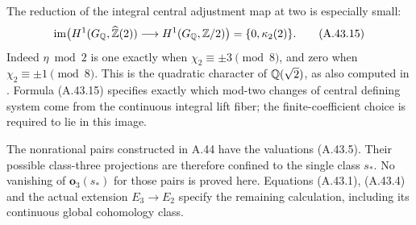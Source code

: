 The reduction of the integral central adjustment map at two
is especially small:
\[
 \operatorname{im}\bigl(H^1(G_\mathbb Q,\widehat{\mathbb Z}(2))
                \longrightarrow H^1(G_\mathbb Q,\mathbb Z/2)\bigr)
                      =\{0,\kappa_2(2)\}.
 \tag{A.43.15}
\]
Indeed $\eta\bmod2$ is one exactly when
$\chi_2\equiv\pm3\pmod8$, and zero when
$\chi_2\equiv\pm1\pmod8$.  This is the quadratic character of
$\mathbb Q(\sqrt2)$, as also computed in
\cite[Lemma 31]{BIR_Wickelgren2012}.  Formula (A.43.15)
specifies exactly which mod-two changes of central defining
system come from the continuous integral lift fiber; the
finite-coefficient choice is required to lie in this image.

The nonrational pairs constructed in A.44 have the valuations
(A.43.5).  Their possible class-three projections are therefore
confined to the single class $s_*$.  No vanishing of
$\mathbf o_3(s_*)$ for those pairs is proved here.  Equations
(A.43.1), (A.43.4) and the actual extension $E_3\to E_2$
specify the remaining calculation, including its continuous
global cohomology class.
